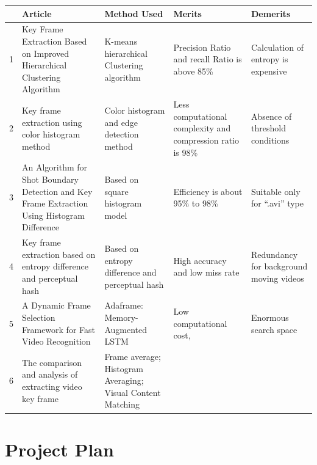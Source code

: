 \documentclass[rnd]{mas_proposal}
\begin{document}
\begin{tabular}{ |p{0.3cm}|p{4.2cm}|p{3cm}|p{2.5cm}|p{2.5cm}|  }
\hline
 & \textbf{Article} & \textbf{Method Used} & \textbf{Merits} & \textbf{Demerits} \\
\hline
\hline
1 &
Key Frame Extraction Based on Improved Hierarchical Clustering Algorithm &
K-means hierarchical Clustering algorithm &
Precision Ratio and recall Ratio is above 85\% &
Calculation of entropy is expensive \\

\hline
2 &
Key frame extraction using color histogram method &
Color histogram and edge detection method &
Less computational complexity and compression ratio is 98\% &
Absence of threshold conditions \\

\hline
3 &
An Algorithm for Shot Boundary Detection and Key Frame Extraction Using Histogram Difference &
Based on square histogram model &
Efficiency is about 95\% to 98\% &
Suitable only for “.avi” type \\

\hline
4 &
Key frame extraction based on entropy difference and perceptual hash &
Based on entropy difference and perceptual hash &
High accuracy and low miss rate &
Redundancy for background moving videos \\

\hline
5 &
A Dynamic Frame Selection Framework for Fast Video Recognition &
Adaframe: Memory-Augmented LSTM &
Low computational cost,  &
Enormous search space \\

\hline
6 &
The comparison and analysis of extracting video key frame &
Frame average; Histogram Averaging; Visual Content Matching &
 &
 \\

\hline
\end{tabular}

\section{Project Plan}
\end{document}

